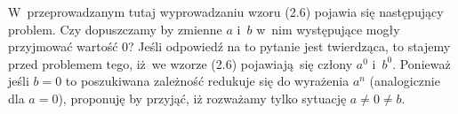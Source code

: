 \documentclass[a4paper,11pt]{article}
\begin{document}
\vspace{\spaceFour}





 W~przeprowadzanym tutaj wyprowadzaniu wzoru (2.6) pojawia się
następujący problem. Czy dopuszczamy by zmienne $a$ i~$b$ w~nim występujące
mogły przyjmować wartość $0$? Jeśli odpowiedź na to pytanie jest twierdząca,
to stajemy przed problemem tego, iż~we wzorze (2.6) pojawiają~się
człony $a^{ 0 }$ i~$b^{ 0 }$. Ponieważ jeśli $b = 0$ to poszukiwana zależność
redukuje się do wyrażenia $a^{ n }$ (analogicznie dla $a = 0$), proponuję by
przyjąć, iż rozważamy tylko sytuację $a \neq 0 \neq b$.

\vspace{\spaceFour}




















\newpage


\vspace{\spaceFive}
\end{document}
